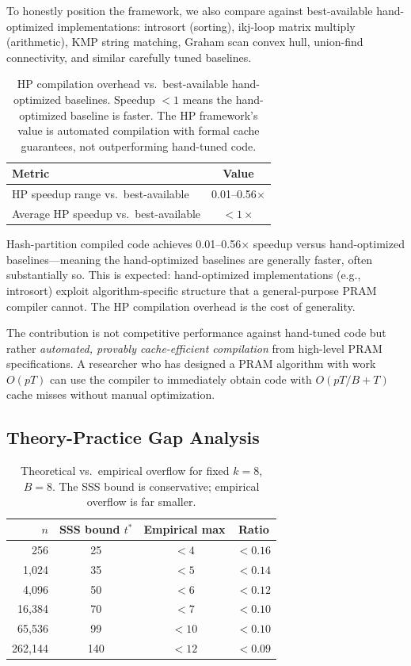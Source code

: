 \documentclass[11pt]{article}
\begin{document}
To honestly position the framework, we also compare against
best-available hand-optimized implementations: introsort (sorting),
ikj-loop matrix multiply (arithmetic), KMP string matching, Graham scan
convex hull, union-find connectivity, and similar carefully tuned
baselines.

\begin{table}[t]
\centering
\caption{HP compilation overhead vs.\ best-available hand-optimized
  baselines.  Speedup $< 1$ means the hand-optimized baseline is faster.
  The HP framework's value is automated compilation with formal
  cache guarantees, not outperforming hand-tuned code.}
\label{tab:best_available}
\begin{tabular}{@{}lc@{}}
\toprule
\textbf{Metric} & \textbf{Value} \\
\midrule
HP speedup range vs.\ best-available & 0.01--0.56$\times$ \\
Average HP speedup vs.\ best-available & $< 1\times$ \\
\bottomrule
\end{tabular}
\end{table}

Hash-partition compiled code achieves 0.01--0.56$\times$ speedup versus
hand-optimized baselines---meaning the hand-optimized baselines are
generally faster, often substantially so.  This is expected:
hand-optimized implementations (e.g., introsort) exploit
algorithm-specific structure that a general-purpose PRAM compiler
cannot.  The HP compilation overhead is the cost of generality.

The contribution is not competitive performance against hand-tuned code
but rather \emph{automated, provably cache-efficient compilation} from
high-level PRAM specifications.  A researcher who has designed a PRAM
algorithm with work $O(pT)$ can use the compiler to immediately obtain
code with $O(pT/B + T)$ cache misses without manual optimization.

\subsection{Theory-Practice Gap Analysis}
\label{sec:eval-gap}

\begin{table}[t]
\centering
\caption{Theoretical vs.\ empirical overflow for fixed $k = 8$, $B = 8$.
  The SSS bound is conservative; empirical overflow is far smaller.}
\label{tab:fixedk_main}
\begin{tabular}{@{}rccc@{}}
\toprule
$n$ & \textbf{SSS bound $t^*$} & \textbf{Empirical max} & \textbf{Ratio} \\
\midrule
256 & 25 & $< 4$ & $< 0.16$ \\
1,024 & 35 & $< 5$ & $< 0.14$ \\
4,096 & 50 & $< 6$ & $< 0.12$ \\
16,384 & 70 & $< 7$ & $< 0.10$ \\
65,536 & 99 & $< 10$ & $< 0.10$ \\
262,144 & 140 & $< 12$ & $< 0.09$ \\
\bottomrule
\end{tabular}
\end{table}
\end{document}
